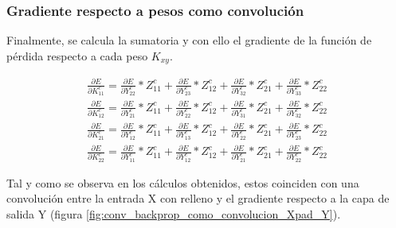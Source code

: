 \subsubsection{Gradiente respecto a pesos como convolución}

Finalmente, se calcula la sumatoria y con ello el gradiente de la función de pérdida respecto a cada peso $K_{xy}$.

\begin{gather}
	\frac{\partial E}{\partial K^c_{11}} = \frac{\partial E}{\partial Y^c_{22}} * Z^c_{11} + \frac{\partial E}{\partial Y^c_{23}} * Z^c_{12} + \frac{\partial E}{\partial Y^c_{32}} * Z^c_{21} + \frac{\partial E}{\partial Y^c_{33}} * Z^c_{22} \\
	\frac{\partial E}{\partial K^c_{12}} = \frac{\partial E}{\partial Y^c_{21}} * Z^c_{11} + \frac{\partial E}{\partial Y^c_{22}} * Z^c_{12} + \frac{\partial E}{\partial Y^c_{31}} * Z^c_{21} + \frac{\partial E}{\partial Y^c_{32}} * Z^c_{22}\\
	\frac{\partial E}{\partial K^c_{21}} = \frac{\partial E}{\partial Y^c_{12}} * Z^c_{11} + \frac{\partial E}{\partial Y^c_{13}} * Z^c_{12} + \frac{\partial E}{\partial Y^c_{22}} * Z^c_{21} + \frac{\partial E}{\partial Y^c_{23}} * Z^c_{22} \\
	\frac{\partial E}{\partial K^c_{22}} = \frac{\partial E}{\partial Y^c_{11}} * Z^c_{11} + \frac{\partial E}{\partial Y^c_{12}} * Z^c_{12} + \frac{\partial E}{\partial Y^c_{21}} * Z^c_{21} + \frac{\partial E}{\partial Y^c_{22}} * Z^c_{22}
\end{gather}

Tal y como se observa en los cálculos obtenidos, estos coinciden con una convolución entre la entrada X con relleno y el gradiente respecto a la capa de salida Y (figura \ref{fig:conv_backprop_como_convolucion_Xpad_Y}).

